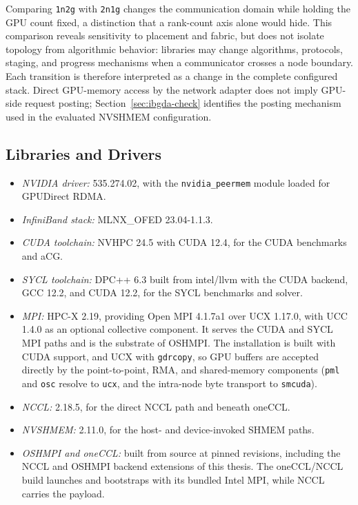 Comparing \texttt{1n2g} with \texttt{2n1g} changes the communication domain while holding the GPU count fixed, a distinction that a rank-count axis alone would hide. This comparison reveals sensitivity to placement and fabric, but does not isolate topology from algorithmic behavior: libraries may change algorithms, protocols, staging, and progress mechanisms when a communicator crosses a node boundary. Each transition is therefore interpreted as a change in the complete configured stack. Direct GPU-memory access by the network adapter does not imply GPU-side request posting; Section~\ref{sec:ibgda-check} identifies the posting mechanism used in the evaluated NVSHMEM configuration.

\subsection{Libraries and Drivers}

\begin{itemize}
    \item \emph{NVIDIA driver:} 535.274.02, with the \texttt{nvidia\_peermem} module loaded for GPUDirect RDMA.
    \item \emph{InfiniBand stack:} MLNX\_OFED 23.04-1.1.3.
    \item \emph{CUDA toolchain:} NVHPC 24.5 with CUDA 12.4, for the CUDA benchmarks and aCG.
    \item \emph{SYCL toolchain:} DPC++ 6.3 built from intel/llvm with the CUDA backend, GCC 12.2, and CUDA 12.2, for the SYCL benchmarks and solver.
    \item \emph{MPI:} HPC-X 2.19, providing Open MPI 4.1.7a1 over UCX 1.17.0, with UCC 1.4.0 \cite{ucc_2025} as an optional collective component. It serves the CUDA and SYCL MPI paths and is the substrate of OSHMPI. The installation is built with CUDA support, and UCX with \texttt{gdrcopy}, so GPU buffers are accepted directly by the point-to-point, RMA, and shared-memory components (\texttt{pml} and \texttt{osc} resolve to \texttt{ucx}, and the intra-node byte transport to \texttt{smcuda}).
    \item \emph{NCCL:} 2.18.5, for the direct NCCL path and beneath oneCCL.
    \item \emph{NVSHMEM:} 2.11.0, for the host- and device-invoked SHMEM paths.
    \item \emph{OSHMPI and oneCCL:} built from source at pinned revisions, including the NCCL and OSHMPI backend extensions of this thesis. The oneCCL/NCCL build launches and bootstraps with its bundled Intel MPI, while NCCL carries the payload.
\end{itemize}

